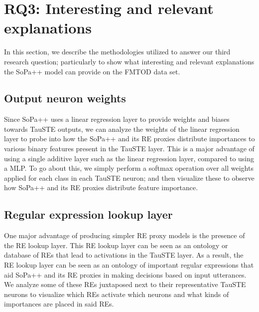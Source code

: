 \section{RQ3: Interesting and relevant explanations}

In this section, we describe the methodologies utilized to answer our third
research question; particularly to show what interesting and relevant
explanations the SoPa++ model can provide on the FMTOD data set.

\subsection{Output neuron weights}

Since SoPa++ uses a linear regression layer to provide weights and biases
towards TauSTE outputs, we can analyze the weights of the linear regression
layer to probe into how the SoPa++ and its RE proxies distribute importances to
various binary features present in the TauSTE layer. This is a major advantage
of using a single additive layer such as the linear regression layer, compared
to using a MLP. To go about this, we simply perform a softmax operation over all
weights applied for each class in each TauSTE neuron; and then visualize these
to observe how SoPa++ and its RE proxies distribute feature importance.

\subsection{Regular expression lookup layer}

One major advantage of producing simpler RE proxy models is the presence of the
RE lookup layer. This RE lookup layer can be seen as an ontology or database of
REs that lead to activations in the TauSTE layer. As a result, the RE lookup
layer can be seen as an ontology of important regular expressions that aid
SoPa++ and its RE proxies in making decisions based on input utterances. We
analyze some of these REs juxtaposed next to their representative TauSTE neurons
to visualize which REs activate which neurons and what kinds of importances are
placed in said REs.

